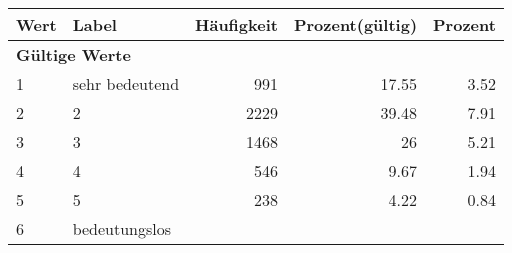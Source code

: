      \begin{longtable}{lXrrr}
     \toprule
     \textbf{Wert} & \textbf{Label} & \textbf{Häufigkeit} & \textbf{Prozent(gültig)} & \textbf{Prozent} \\
     \endhead
     \midrule
     \multicolumn{5}{l}{\textbf{Gültige Werte}}\\

     1 &
     \multicolumn{1}{X}{ sehr bedeutend   } &


       \num{991} &
       \num[round-mode=places,round-precision=2]{17.55} &
         \num[round-mode=places,round-precision=2]{3.52} \\

     2 &
     \multicolumn{1}{X}{ 2   } &


       \num{2229} &
       \num[round-mode=places,round-precision=2]{39.48} &
         \num[round-mode=places,round-precision=2]{7.91} \\

     3 &
     \multicolumn{1}{X}{ 3   } &


       \num{1468} &
       \num[round-mode=places,round-precision=2]{26} &
         \num[round-mode=places,round-precision=2]{5.21} \\

     4 &
     \multicolumn{1}{X}{ 4   } &


       \num{546} &
       \num[round-mode=places,round-precision=2]{9.67} &
         \num[round-mode=places,round-precision=2]{1.94} \\

     5 &
     \multicolumn{1}{X}{ 5   } &


       \num{238} &
       \num[round-mode=places,round-precision=2]{4.22} &
         \num[round-mode=places,round-precision=2]{0.84} \\

     6 &
     \multicolumn{1}{X}{ bedeutungslos   } &



\end{longtable}
